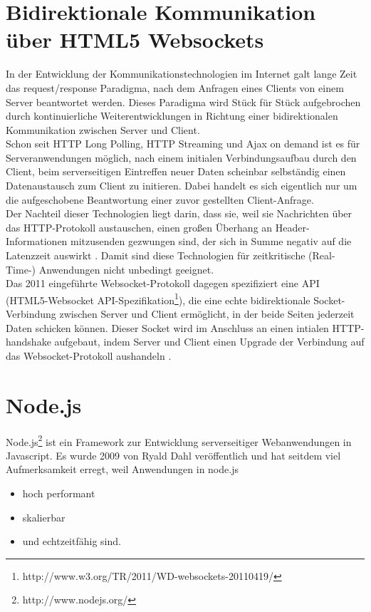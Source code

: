 \section{Bidirektionale Kommunikation über HTML5 Websockets}\label{s.Websockets}
In der Entwicklung der Kommunikationstechnologien im Internet galt lange Zeit das request/response Paradigma, nach dem Anfragen eines Clients von einem Server beantwortet werden. Dieses Paradigma wird Stück für Stück aufgebrochen durch kontinuierliche Weiterentwicklungen in Richtung einer bidirektionalen Kommunikation zwischen Server und Client.\\
Schon seit HTTP Long Polling, HTTP Streaming und Ajax on demand ist es für Serveranwendungen möglich, nach einem initialen Verbindungsaufbau durch den Client, beim serverseitigen Eintreffen neuer Daten scheinbar selbständig einen Datenaustausch zum Client zu initieren. Dabei handelt es sich eigentlich nur um die aufgeschobene Beantwortung einer zuvor gestellten Client-Anfrage.\\
Der Nachteil dieser Technologien liegt darin, dass sie, weil sie Nachrichten über das HTTP-Protokoll austauschen, einen großen Überhang an Header-Informationen mitzusenden gezwungen sind, der sich in Summe negativ auf die Latenzzeit auswirkt \cite{varaksin}. Damit sind diese Technologien für zeitkritische (Real-Time-) Anwendungen nicht unbedingt geeignet.
\\
Das 2011 eingeführte Websocket-Protokoll dagegen spezifiziert eine API (HTML5-Websocket API-Spezifikation\footnote{http://www.w3.org/TR/2011/WD-websockets-20110419/}), die eine echte bidirektionale Socket-Verbindung zwischen Server und Client ermöglicht, in der beide Seiten jederzeit Daten schicken können. Dieser Socket wird im Anschluss an einen intialen HTTP-handshake aufgebaut, indem Server und Client  einen Upgrade der Verbindung auf das Websocket-Protokoll aushandeln  \cite{html5rocks}. 

\section{Node.js}\label{node.js}
Node.js\footnote{http://www.nodejs.org/} ist ein Framework zur Entwicklung serverseitiger Webanwendungen in Javascript. Es wurde 2009 von Ryald Dahl veröffentlich und hat seitdem viel Aufmerksamkeit erregt, weil Anwendungen in node.js
\begin{itemize}

\item hoch performant
\item skalierbar
\item und echtzeitfähig sind.
\end{itemize}

